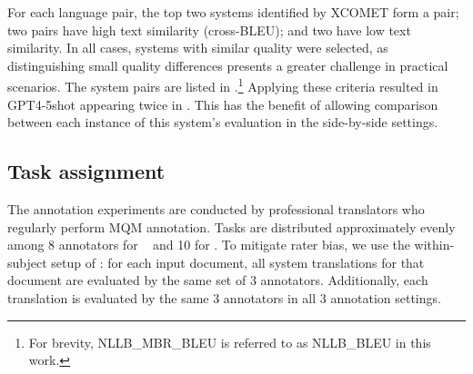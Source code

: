 For each language pair, the top two systems identified by XCOMET form a pair; two pairs have high text similarity (cross-BLEU); and two have low text similarity. In all cases, systems with similar quality were selected, as distinguishing small quality differences presents a greater challenge in practical scenarios. The system pairs are listed in .\footnote{For brevity, NLLB\_MBR\_BLEU is referred to as NLLB\_BLEU in this work.} Applying these criteria resulted in GPT4-5shot appearing twice in \EnDe. This has the benefit of allowing comparison between each instance of this system's evaluation in the side-by-side settings.%

\subsection{Task assignment}\label{sec:task_assignment}

The annotation experiments are conducted by professional translators who regularly perform MQM annotation. Tasks are distributed approximately evenly among 8 annotators for \ZhEn~ and 10 for \EnDe. To mitigate rater bias, we use the within-subject setup of \citet{riley-etal-2024-finding}: for each input document, all system translations for that document are evaluated by the same set of 3 annotators. Additionally, each translation is evaluated by the same 3 annotators in all 3 annotation settings.



